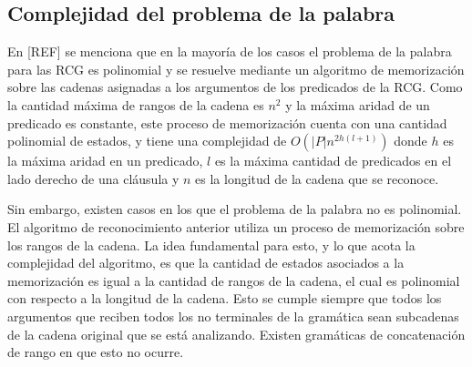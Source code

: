 \documentclass{report}
\theoremstyle{definition}
\theoremstyle{plain}
\theoremstyle{remark}
\begin{document}
\subsection{Complejidad del problema de la palabra}

En [REF] se menciona que en la mayoría de los casos el
problema de la palabra para las RCG es polinomial y se resuelve mediante
un algoritmo de memorización sobre las cadenas asignadas a los argumentos
de los predicados de la RCG. Como la cantidad máxima de rangos de la
cadena es $n^2$ y la máxima aridad de un predicado es constante, este
proceso de memorización cuenta con una cantidad polinomial de estados, y
tiene una complejidad de $O(|P| n^{2h(l+1)})$ donde $h$ es la máxima
aridad en un predicado, $l$ es la máxima cantidad de predicados en el
lado derecho de una cláusula y $n$ es la longitud de la cadena que se
reconoce.

Sin embargo, existen casos en los que el problema de la palabra no es
polinomial. El algoritmo de reconocimiento anterior utiliza un proceso
de memorización sobre los rangos de la cadena. La idea fundamental para
esto, y lo que acota la complejidad del algoritmo, es que la cantidad de
estados asociados a la memorización es igual a la cantidad de rangos de
la cadena, el cual es polinomial con respecto a la longitud de la
cadena. Esto se cumple siempre que todos los argumentos que reciben
todos los no terminales de la gramática sean subcadenas de la cadena
original que se está analizando. Existen gramáticas de concatenación de
rango en que esto no ocurre.
\end{document}
